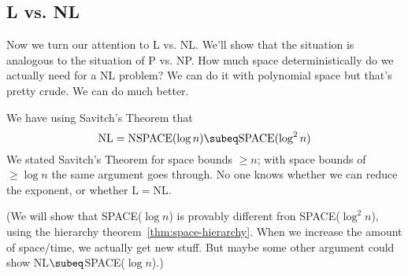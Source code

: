 \subsection{L vs. NL}
Now we turn our attention to L vs. NL. We'll show that the situation is analogous to the situation of P vs. NP. How much space deterministically do we actually need for a NL problem? We can do it with polynomial space but that's pretty crude. We can do much better.

We have using Savitch's Theorem that
\[
\text{NL}=\text{NSPACE}(\log n)\subeq \text{SPACE}(\log^2n)
\]
We stated Savitch's Theorem for space bounds $\ge n$; with space bounds of $\ge\log n$ the same argument goes through. %
No one knows whether we can reduce the exponent, or whether L$=$NL.

(We will show that SPACE($\log n$) is provably different fron SPACE($\log^2 n$), using the hierarchy theorem~\ref{thm:space-hierarchy}. When we increase the amount of space/time, we actually get new stuff.
But maybe some other argument could show NL$\subeq$SPACE($\log n$).)

